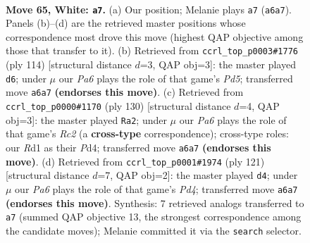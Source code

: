 \documentclass[11pt]{article}
\begin{document}
\clearpage

\begin{figure}[p]\centering
\begin{subfigure}{0.46\textwidth}\centering
\resizebox{\linewidth}{!}{%
\newchessgame
\chessboard[
  setfen={5rk1/8/P7/8/8/6K1/8/3R4 w - - 15 65},
  showmover=false,
  pgfstyle=straightmove, color=movearrow, markmove={a6-a7}
]}
\caption{}
\end{subfigure}\hfill
\begin{subfigure}{0.46\textwidth}\centering
\resizebox{\linewidth}{!}{%
\newchessgame
\chessboard[
  setfen={8/3K4/5p2/3P4/4rk2/R7/8/8 w - - 0 58},
  showmover=false,
  pgfstyle=straightmove, color=movearrow, markmove={d5-d6}
]}
\caption{}
\end{subfigure}
\\[4pt]
\begin{subfigure}{0.46\textwidth}\centering
\resizebox{\linewidth}{!}{%
\newchessgame
\chessboard[
  setfen={8/3kr3/6K1/3p4/3P4/8/2R5/8 w - - 14 66},
  showmover=false,
  pgfstyle=straightmove, color=movearrow, markmove={c2-a2}
]}
\caption{}
\end{subfigure}\hfill
\begin{subfigure}{0.46\textwidth}\centering
\resizebox{\linewidth}{!}{%
\newchessgame
\chessboard[
  setfen={5r2/8/8/3pk3/7P/6R1/6K1/8 b - - 2 61},
  showmover=false,
  pgfstyle=straightmove, color=movearrow, markmove={d5-d4}
]}
\caption{}
\end{subfigure}
\caption{\textbf{Move 65, White: \texttt{a7}.} (a) Our position; Melanie plays \texttt{a7} (\texttt{a6a7}). Panels (b)--(d) are the retrieved master positions whose correspondence most drove this move (highest QAP objective among those that transfer to it). (b) Retrieved from \texttt{ccrl\_top\_p0003\#1776} (ply 114) [structural distance $d$=3, QAP obj=3]: the master played \texttt{d6}; under $\mu$ our \emph{Pa6} plays the role of that game's \emph{Pd5}; transferred move \texttt{a6a7} \textbf{(endorses this move)}. (c) Retrieved from \texttt{ccrl\_top\_p0000\#1170} (ply 130) [structural distance $d$=4, QAP obj=3]: the master played \texttt{Ra2}; under $\mu$ our \emph{Pa6} plays the role of that game's \emph{Rc2} (a \textbf{cross-type} correspondence); cross-type roles: our \emph{R}d1 as their \emph{P}d4; transferred move \texttt{a6a7} \textbf{(endorses this move)}. (d) Retrieved from \texttt{ccrl\_top\_p0001\#1974} (ply 121) [structural distance $d$=7, QAP obj=2]: the master played \texttt{d4}; under $\mu$ our \emph{Pa6} plays the role of that game's \emph{Pd4}; transferred move \texttt{a6a7} \textbf{(endorses this move)}. Synthesis: 7 retrieved analogs transferred to \texttt{a7} (summed QAP objective 13, the strongest correspondence among the candidate moves); Melanie committed it via the \texttt{search} selector.}
\label{fig:thought-m128}
\end{figure}
\end{document}
